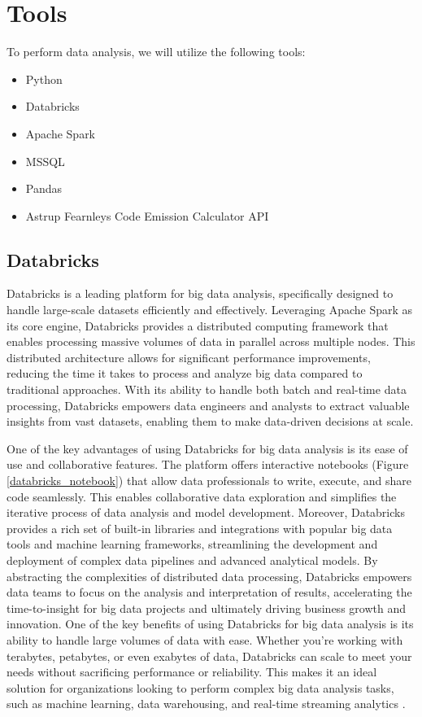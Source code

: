 \section{Tools}

To perform data analysis, we will utilize the following tools:

\begin{itemize}
    \item Python
    \item Databricks
    \item Apache Spark
    \item MSSQL
    \item Pandas
    \item Astrup Fearnleys Code Emission Calculator API
\end{itemize}

\subsection{Databricks}

Databricks is a leading platform for big data analysis, specifically designed to handle \newline large-scale datasets efficiently and effectively.
Leveraging Apache Spark as its core engine, Databricks provides a distributed computing framework that enables processing massive volumes of data in parallel across multiple nodes.
This distributed architecture allows for significant performance improvements, reducing the time it takes to process and analyze big data compared to traditional approaches.
With its ability to handle both batch and real-time data processing, Databricks empowers data engineers and analysts to extract valuable insights from vast datasets, enabling them to make data-driven decisions at scale.

One of the key advantages of using Databricks for big data analysis is its ease of use and collaborative features.
The platform offers interactive notebooks (Figure \ref{databricks_notebook})  that allow data professionals to write, execute, and share code seamlessly.
This enables collaborative data exploration and simplifies the iterative process of data analysis and model development.
Moreover, Databricks provides a rich set of built-in libraries and integrations with popular big data tools and machine learning frameworks, streamlining the development and deployment of complex data pipelines and advanced analytical models.
By abstracting the complexities of distributed data processing, Databricks empowers data teams to focus on the analysis and interpretation of results, accelerating the time-to-insight for big data projects and ultimately driving business growth and innovation.
One of the key benefits of using Databricks for big data analysis is its ability to handle large volumes of data with ease.
Whether you're working with terabytes, petabytes, or even exabytes of data, Databricks can scale to meet your needs without sacrificing performance or reliability.
This makes it an ideal solution for organizations looking to perform complex big data analysis tasks, such as machine learning, data warehousing, and real-time streaming analytics \autocite{databricksDataLakehouse}.


